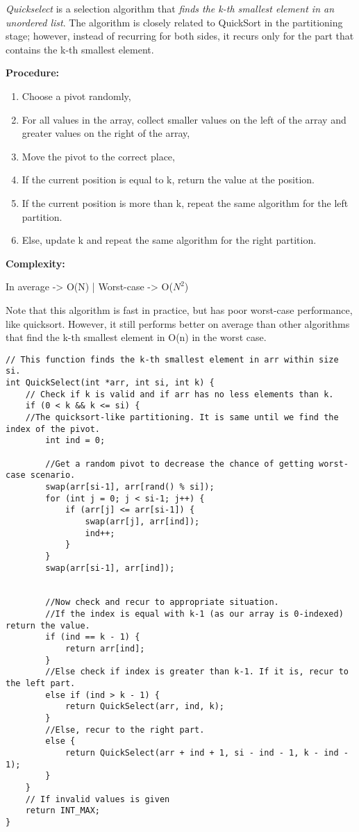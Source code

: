 \documentclass[12pt]{article}
\begin{document}
	\textit{Quickselect} is a selection algorithm that \textit{finds the k-th smallest element in an unordered list}. The algorithm is closely related to QuickSort in the partitioning stage; however, instead of recurring for both sides, it recurs only for the part that contains the k-th smallest element.

\textbf{Procedure: }
\begin{enumerate}
	\item Choose a pivot randomly,
	\item For all values in the array, collect smaller values on the left of the array and greater values on the right of the array,
	\item Move the pivot to the correct place,
	\item If the current position is equal to k, return the value at the position.
	\item If the current position is more than k, repeat the same algorithm for the left partition.
	\item Else, update k and repeat the same algorithm for the right partition.
\end{enumerate}	

\textbf{Complexity: }

	In average -> O(N)  |  Worst-case -> O($N^{2}$)

    Note that this algorithm is fast in practice, but has poor worst-case performance, like quicksort. However, it still performs better on average than other algorithms that find the k-th smallest element in O(n) in the worst case.


\begin{verbatim}
// This function finds the k-th smallest element in arr within size si.
int QuickSelect(int *arr, int si, int k) {
    // Check if k is valid and if arr has no less elements than k.
    if (0 < k && k <= si) {
    //The quicksort-like partitioning. It is same until we find the index of the pivot.
        int ind = 0;
        
        //Get a random pivot to decrease the chance of getting worst-case scenario.
        swap(arr[si-1], arr[rand() % si]);
        for (int j = 0; j < si-1; j++) {
            if (arr[j] <= arr[si-1]) {
                swap(arr[j], arr[ind]);
                ind++;
            }
        }
        swap(arr[si-1], arr[ind]);
        
        
        //Now check and recur to appropriate situation.
        //If the index is equal with k-1 (as our array is 0-indexed) return the value.
        if (ind == k - 1) {
            return arr[ind];
        }
        //Else check if index is greater than k-1. If it is, recur to the left part.
        else if (ind > k - 1) {
            return QuickSelect(arr, ind, k);
        }
        //Else, recur to the right part.
        else {
            return QuickSelect(arr + ind + 1, si - ind - 1, k - ind - 1);
        }
    }
    // If invalid values is given
    return INT_MAX;  
}
\end{verbatim}
\end{document}
